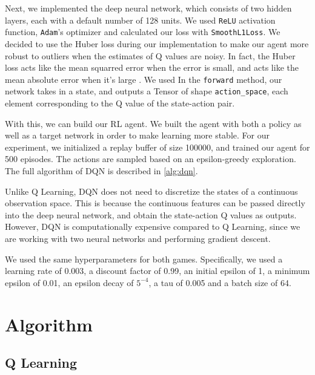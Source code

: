 \documentclass{article}
\begin{document}
Next, we implemented the deep neural network, which consists of two hidden
layers, each with a default number of 128 units. We used \verb+ReLU+ activation
function, \verb+Adam+'s optimizer and calculated our loss with
\verb+SmoothL1Loss+. We decided to use the Huber loss during our implementation
to make our agent more robust to outliers when the estimates of Q values are
noisy. In fact, the Huber loss acts like the mean squarred error when the error
is small, and acts like the mean absolute error when it's large \cite{hubert}.
We used In the \verb+forward+ method, our network takes in a state, and outputs
a Tensor of shape \verb+action_space+, each element corresponding to the Q
value of the state-action pair.

With this, we can build our RL agent. We built the agent with both a policy as
well as a target network in order to make learning more stable. For our
experiment, we initialized a replay buffer of size 100000, and trained our
agent for 500 episodes. The actions are sampled based on an epsilon-greedy
exploration. The full algorithm of DQN is described in \cref{alg:dqn}.

Unlike Q Learning, DQN does not need to discretize the states of a continuous
observation space. This is because the continuous features can be passed
directly into the deep neural network, and obtain the state-action Q values as
outputs. However, DQN is computationally expensive compared to Q Learning,
since we are working with two neural networks and performing gradient descent.

We used the same hyperparameters for both games. Specifically, we used a
learning rate of 0.003, a discount factor of 0.99, an initial epsilon of 1, a
minimum epsilon of 0.01, an epsilon decay of \(5^{-4}\), a tau of 0.005 and a
batch size of 64.

\section{Algorithm}

\subsection{Q Learning}
\end{document}
